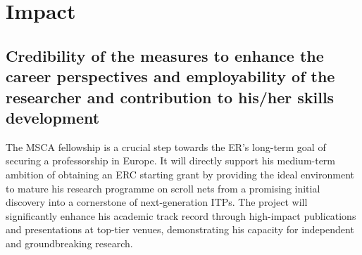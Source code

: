 \documentclass[11pt]{msca-pf}
\newcommand{\proj}{\small\textsc{ScrollNets}}
\newcommand{\TO}[1]{$\mathsf{TO#1}$}
\begin{document}

\section{Impact }
\label{sc:impact}

\subsection{Credibility of the measures to enhance the career perspectives
    and employability of the researcher and contribution to his/her skills
    development}
\label{ssc:impact:career}

The MSCA fellowship is a crucial step towards the ER's long-term goal of securing a professorship in
Europe. It will directly support his medium-term ambition of obtaining an ERC starting grant by
providing the ideal environment to mature his research programme on scroll nets from a promising
initial discovery into a cornerstone of next-generation ITPs. The project will significantly enhance
his academic track record through high-impact publications and presentations at top-tier venues,
demonstrating his capacity for independent and groundbreaking research.

\end{document}
